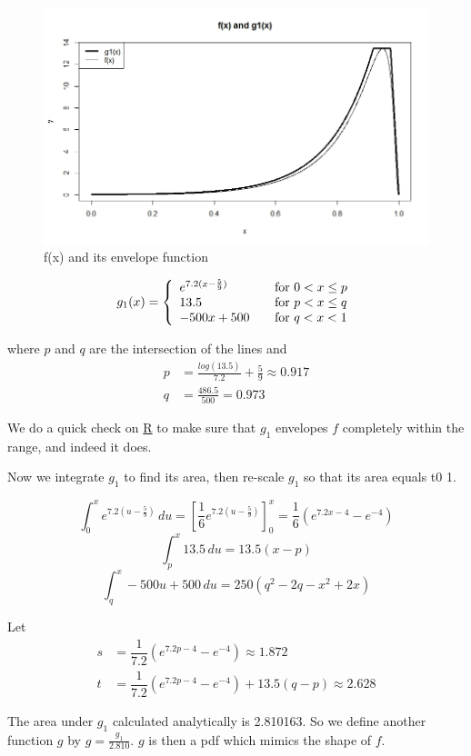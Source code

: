 \documentclass[11pt, a4paper]{article}
\begin{document}
\begin{figure}[H]
\centering
	\includegraphics[scale=0.4]{1a.jpeg}
\caption{f(x) and its envelope function}
\end{figure}
\[ g_1(x) = \left\{ 
\begin{array}{l l}
e^{7.2 (x-\frac59 )} & \quad \text{for } 0 < x \leq p\\
13.5 & \quad \text{for } p < x \leq q \\
-500x+500 & \quad \text{for } q < x < 1
\end{array} \right.\]

where $p$ and $q$ are the intersection of the lines and
\begin{align*}
p &= \frac{log(13.5)}{7.2} + \frac59 \approx 0.917
\\ q &= \frac{486.5}{500} = 0.973
\end{align*}

We do a quick check on \url{R} to make sure that $g_1$ envelopes $f$ completely within the range, and indeed it does.

Now we integrate $g_1$ to find its area, then re-scale $g_1$ so that its area equals t0 1.

$$\int_0^x e^{7.2(u-\frac59)} \,du = \left[ \frac16 e^{7.2(u-\frac59)} \right]_0^x = \frac16(e^{7.2x-4}-e^{-4}) $$
$$ \int_p^x 13.5 \,du = 13.5(x-p) $$
$$ \int_q^x -500u+500 \,du = 250(q^2 - 2q - x^2 + 2x) $$

Let 
\begin{align*}
 s &= \dfrac1{7.2}(e^{7.2p-4}-e^{-4}) \approx 1.872
\\ t &= \dfrac1{7.2}(e^{7.2p-4}-e^{-4}) + 13.5(q-p) \approx 2.628
\end{align*}

The area under $g_1$ calculated analytically is 2.810163. So we define another function $g$ by $g = \frac{g_1}{2.810}$. $g$ is then a pdf which mimics the shape of $f$.
\end{document}
